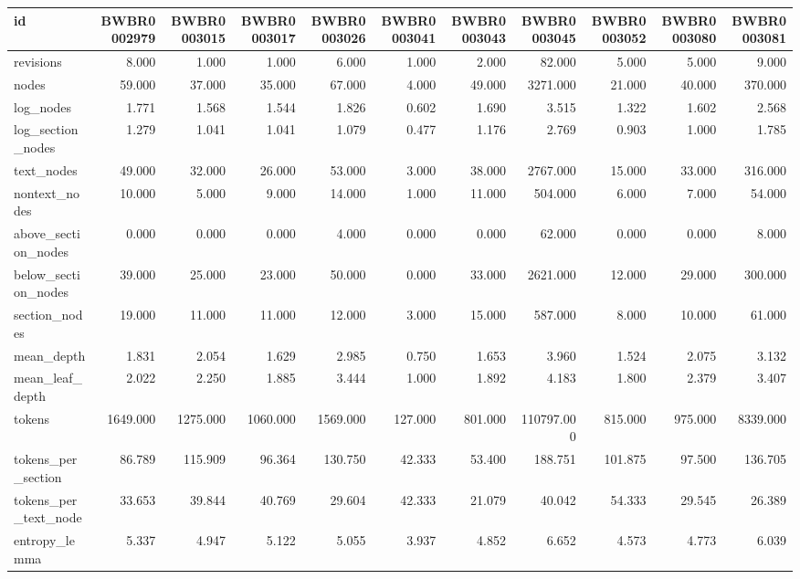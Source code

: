 \begin{tabular}{lrrrrrrrrrr}
\toprule
id & BWBR0002979 & BWBR0003015 & BWBR0003017 & BWBR0003026 & BWBR0003041 & BWBR0003043 & BWBR0003045 & BWBR0003052 & BWBR0003080 & BWBR0003081 \\
\midrule
revisions & 8.000 & 1.000 & 1.000 & 6.000 & 1.000 & 2.000 & 82.000 & 5.000 & 5.000 & 9.000 \\
\cline{1-11}
nodes & 59.000 & 37.000 & 35.000 & 67.000 & 4.000 & 49.000 & 3271.000 & 21.000 & 40.000 & 370.000 \\
\cline{1-11}
log\_nodes & 1.771 & 1.568 & 1.544 & 1.826 & 0.602 & 1.690 & 3.515 & 1.322 & 1.602 & 2.568 \\
\cline{1-11}
log\_section\_nodes & 1.279 & 1.041 & 1.041 & 1.079 & 0.477 & 1.176 & 2.769 & 0.903 & 1.000 & 1.785 \\
\cline{1-11}
text\_nodes & 49.000 & 32.000 & 26.000 & 53.000 & 3.000 & 38.000 & 2767.000 & 15.000 & 33.000 & 316.000 \\
\cline{1-11}
nontext\_nodes & 10.000 & 5.000 & 9.000 & 14.000 & 1.000 & 11.000 & 504.000 & 6.000 & 7.000 & 54.000 \\
\cline{1-11}
above\_section\_nodes & 0.000 & 0.000 & 0.000 & 4.000 & 0.000 & 0.000 & 62.000 & 0.000 & 0.000 & 8.000 \\
\cline{1-11}
below\_section\_nodes & 39.000 & 25.000 & 23.000 & 50.000 & 0.000 & 33.000 & 2621.000 & 12.000 & 29.000 & 300.000 \\
\cline{1-11}
section\_nodes & 19.000 & 11.000 & 11.000 & 12.000 & 3.000 & 15.000 & 587.000 & 8.000 & 10.000 & 61.000 \\
\cline{1-11}
mean\_depth & 1.831 & 2.054 & 1.629 & 2.985 & 0.750 & 1.653 & 3.960 & 1.524 & 2.075 & 3.132 \\
\cline{1-11}
mean\_leaf\_depth & 2.022 & 2.250 & 1.885 & 3.444 & 1.000 & 1.892 & 4.183 & 1.800 & 2.379 & 3.407 \\
\cline{1-11}
tokens & 1649.000 & 1275.000 & 1060.000 & 1569.000 & 127.000 & 801.000 & 110797.000 & 815.000 & 975.000 & 8339.000 \\
\cline{1-11}
tokens\_per\_section & 86.789 & 115.909 & 96.364 & 130.750 & 42.333 & 53.400 & 188.751 & 101.875 & 97.500 & 136.705 \\
\cline{1-11}
tokens\_per\_text\_node & 33.653 & 39.844 & 40.769 & 29.604 & 42.333 & 21.079 & 40.042 & 54.333 & 29.545 & 26.389 \\
\cline{1-11}
entropy\_lemma & 5.337 & 4.947 & 5.122 & 5.055 & 3.937 & 4.852 & 6.652 & 4.573 & 4.773 & 6.039 \\

\end{tabular}
